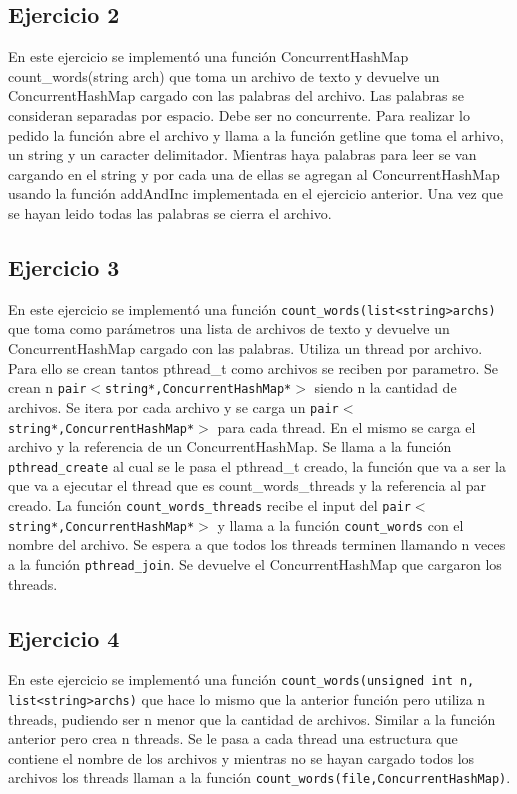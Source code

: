 \documentclass[a4paper]{article}
\begin{document}
{\begin{itemize}
\end{itemize}

\subsection{Ejercicio 2}

En este ejercicio se implementó una función ConcurrentHashMap count_words(string arch) que toma un archivo de texto y devuelve un ConcurrentHashMap cargado con las palabras del archivo. Las palabras se consideran separadas por espacio. Debe ser no concurrente.
Para realizar lo pedido la función abre el archivo y llama a la función getline que toma el arhivo, un string y un caracter delimitador. Mientras haya palabras para leer se van cargando en el string y por cada una de ellas se agregan al ConcurrentHashMap usando la función addAndInc implementada en el ejercicio anterior. Una vez que se hayan leido todas las palabras se cierra el archivo.


\subsection{Ejercicio 3}

En este ejercicio se implementó una función {\tt count_words(list<string>archs)} que toma como parámetros una lista de archivos de texto y devuelve un ConcurrentHashMap cargado con las palabras. Utiliza un thread por archivo.
Para ello se crean tantos pthread_t como archivos se reciben por parametro. Se crean n {\tt pair$<$string*,ConcurrentHashMap*$>$} siendo n la cantidad de archivos. Se itera por cada archivo y se carga un {\tt pair$<$string*,ConcurrentHashMap*$>$} para cada thread. En el mismo se carga el archivo y la referencia de un ConcurrentHashMap. Se llama a la función {\tt pthread_create} al cual se le pasa el pthread_t creado, la función que va a ser la que va a ejecutar el thread que es count_words_threads y la referencia al par creado. La función {\tt count_words_threads} recibe el input del {\tt pair$<$string*,ConcurrentHashMap*$>$} y llama a la función {\tt count_words} con el nombre del archivo. Se espera a que todos los threads terminen llamando n veces a la función {\tt pthread_join}. Se devuelve el ConcurrentHashMap que cargaron los threads.


\subsection{Ejercicio 4}
En este ejercicio se implementó una función {\tt count_words(unsigned int n, list<string>archs)} que hace lo mismo que la anterior función pero utiliza n threads, pudiendo ser n menor que la cantidad de archivos. Similar a la función anterior pero crea n threads. Se le pasa a cada thread una estructura que contiene el nombre de los archivos y mientras no se hayan cargado todos los archivos los threads llaman a la función {\tt count_words(file,ConcurrentHashMap)}.

}
\end{document}
